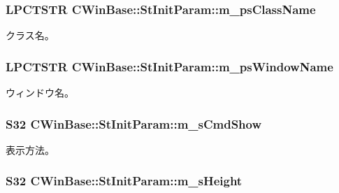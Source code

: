 \subsubsection[{m\+\_\+ps\+Class\+Name}]{\setlength{\rightskip}{0pt plus 5cm}L\+P\+C\+T\+S\+T\+R C\+Win\+Base\+::\+St\+Init\+Param\+::m\+\_\+ps\+Class\+Name}\label{struct_c_win_base_1_1_st_init_param_a6f0109f9870322c34383df446881f1b6}


クラス名。 

\hypertarget{struct_c_win_base_1_1_st_init_param_aebbcbe5bc98fc43ba909a601c2407c3c}{}
\subsubsection[{m\+\_\+ps\+Window\+Name}]{\setlength{\rightskip}{0pt plus 5cm}L\+P\+C\+T\+S\+T\+R C\+Win\+Base\+::\+St\+Init\+Param\+::m\+\_\+ps\+Window\+Name}\label{struct_c_win_base_1_1_st_init_param_aebbcbe5bc98fc43ba909a601c2407c3c}


ウィンドウ名。 

\hypertarget{struct_c_win_base_1_1_st_init_param_ad7ba6c400f9028868909656571ea9c36}{}
\subsubsection[{m\+\_\+s\+Cmd\+Show}]{\setlength{\rightskip}{0pt plus 5cm}S32 C\+Win\+Base\+::\+St\+Init\+Param\+::m\+\_\+s\+Cmd\+Show}\label{struct_c_win_base_1_1_st_init_param_ad7ba6c400f9028868909656571ea9c36}


表示方法。 

\hypertarget{struct_c_win_base_1_1_st_init_param_a51423e4cac3660a8c06e766173b33074}{}
\subsubsection[{m\+\_\+s\+Height}]{\setlength{\rightskip}{0pt plus 5cm}S32 C\+Win\+Base\+::\+St\+Init\+Param\+::m\+\_\+s\+Height}\label{struct_c_win_base_1_1_st_init_param_a51423e4cac3660a8c06e766173b33074}


